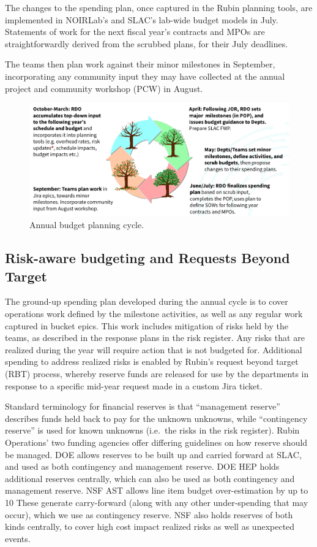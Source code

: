 \begin{itemize}
The changes to the spending plan, once captured in the Rubin planning tools, are implemented in NOIRLab's and SLAC's lab-wide budget models in July.
Statements of work for the next fiscal year's contracts and MPOs are straightforwardly derived from the scrubbed plans, for their July deadlines.

The teams then plan work against their minor milestones in September, incorporating any community input they may have collected at the annual project and community workshop (PCW) in August.

\begin{figure}[!ht]
\includegraphics[width=0.95\linewidth]{figures/annual-budget-cycle.png}
\caption{Annual budget planning cycle.}
\label{fig:annual-cycle}
\end{figure}


\subsection{Risk-aware budgeting and Requests Beyond Target}

The ground-up spending plan developed during the annual cycle is to cover operations work defined by the milestone activities, as well as any regular work captured in bucket epics.
This work includes mitigation of risks held by the teams, as described in the response plans in the risk register.
Any risks that are realized during the year will require action that is not budgeted for.
Additional spending to address realized risks is enabled by Rubin's request beyond target (RBT) process, whereby reserve funds are released for use by the departments in response to a specific mid-year request made in a custom Jira ticket.

Standard terminology for financial reserves is that ``management reserve'' describes funds held back to pay for the unknown unknowns, while ``contingency reserve'' is used for known unknowns (i.e.\ the risks in the risk register).
Rubin Operations' two funding agencies offer differing guidelines on how reserve should be managed.
DOE allows reserves to be built up and carried forward at SLAC, and used as both contingency and management reserve.
DOE HEP holds additional reserves centrally, which can also be used as both contingency and management reserve.
NSF AST allows line item budget over-estimation by up to 10%
These generate carry-forward (along with any other under-spending that may occur), which we use as contingency reserve.
NSF also holds reserves of both kinds centrally, to cover high cost impact realized risks as well as unexpected events.


\end{itemize}
